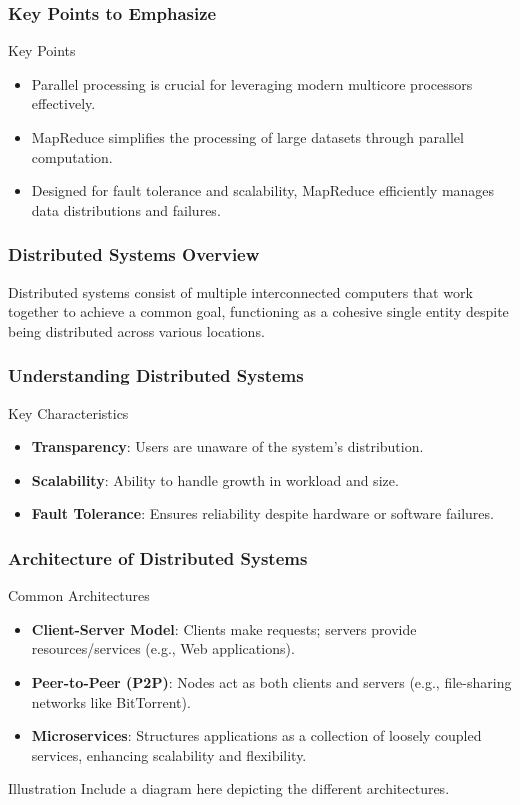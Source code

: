 \documentclass[aspectratio=169]{beamer}
\begin{document}
\begin{frame}[fragile]
    \frametitle{Key Points to Emphasize}
    \begin{block}{Key Points}
        \begin{itemize}
            \item Parallel processing is crucial for leveraging modern multicore processors effectively.
            \item MapReduce simplifies the processing of large datasets through parallel computation.
            \item Designed for fault tolerance and scalability, MapReduce efficiently manages data distributions and failures.
        \end{itemize}
    \end{block}
\end{frame}

\begin{frame}[fragile]
    \frametitle{Distributed Systems Overview}
    Distributed systems consist of multiple interconnected computers that work together to achieve a common goal, functioning as a cohesive single entity despite being distributed across various locations.
\end{frame}

\begin{frame}[fragile]
    \frametitle{Understanding Distributed Systems}
    \begin{block}{Key Characteristics}
        \begin{itemize}
            \item \textbf{Transparency}: Users are unaware of the system’s distribution.
            \item \textbf{Scalability}: Ability to handle growth in workload and size.
            \item \textbf{Fault Tolerance}: Ensures reliability despite hardware or software failures.
        \end{itemize}
    \end{block}
\end{frame}

\begin{frame}[fragile]
    \frametitle{Architecture of Distributed Systems}
    \begin{block}{Common Architectures}
        \begin{itemize}
            \item \textbf{Client-Server Model}: Clients make requests; servers provide resources/services (e.g., Web applications).
            \item \textbf{Peer-to-Peer (P2P)}: Nodes act as both clients and servers (e.g., file-sharing networks like BitTorrent).
            \item \textbf{Microservices}: Structures applications as a collection of loosely coupled services, enhancing scalability and flexibility.
        \end{itemize}
    \end{block}
    \begin{block}{Illustration}
        Include a diagram here depicting the different architectures.
    \end{block}
\end{frame}
\end{document}
